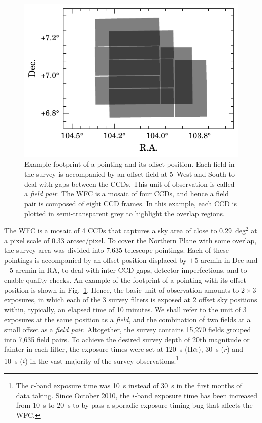\documentclass[a4paper,useAMS,usenatbib]{mn2e}
\def\ha{\mbox{H$\rm \alpha$}}
\begin{document}
\begin{figure}
    \includegraphics[width=\linewidth]{figures/fieldpair/fieldpair.pdf} 
    \caption{
    Example footprint of a pointing and its offset position.
    Each field in the survey is accompanied by an offset field
    at 5\arcmin\ West and South
	to deal with gaps between the CCDs.
	This unit of observation is called a \emph{field pair}.
	The WFC is a mosaic of four CCDs,
	and hence a field pair is composed of eight CCD frames.
	In this example, each CCD is plotted in semi-transparent grey
	to highlight the overlap regions.
	}
    \label{fig:fieldpair}
\end{figure}

The WFC is a mosaic of 4 CCDs 
that captures a sky area of close to 0.29~deg$^2$ at a pixel scale of
0.33 arcsec/pixel.
To cover the Northern Plane with some overlap,
the survey area was divided into 7,635 telescope pointings.
Each of these pointings is accompanied by an offset position
displaced by $+$5 arcmin in Dec 
and $+$5 arcmin in RA,
to deal with inter-CCD gaps, detector imperfections,
and to enable quality checks.
An example of the footprint of a pointing
with its offset position is shown in Fig.~\ref{fig:fieldpair}.
Hence, the basic unit of observation
amounts to $2 \times 3$ exposures, 
in which each of the 3 survey filters is exposed at 2 offset sky positions 
within, typically, an elapsed time of 10 minutes.
We shall refer to the unit of 3 exposures at the same position 
as a \emph{field},
and the combination of two fields at a small offset as a \emph{field pair}.
Altogether, the survey contains 15,270 fields
grouped into 7,635 field pairs.
To achieve the desired survey depth
of 20th magnitude or fainter in each filter, 
the exposure times were set at 120~s (\ha), 
30~s ($r$) and 10~s ($i$)
in the vast majority of the survey observations.\footnote{The $r$-band exposure time was 10~s instead of 30~s in the first months of data taking. Since October 2010, the $i$-band exposure time 
has been increased from 10~s to 20~s to by-pass a sporadic exposure timing bug that affects the WFC.}
\end{document}
